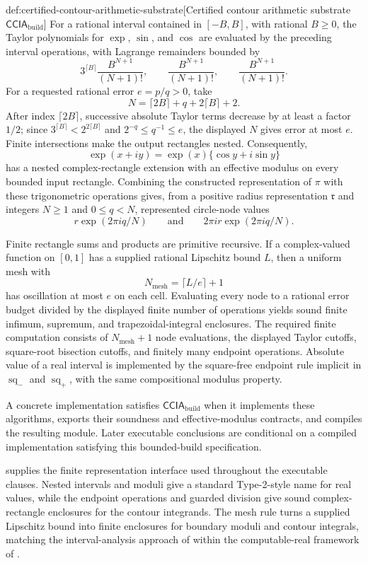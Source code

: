 \documentclass[11pt]{article}
\begin{document}
\begin{definitionv}{def:certified-contour-arithmetic-substrate}[Certified contour arithmetic substrate \(\mathsf{CCIA}_{\mathrm{build}}\)]
For a rational interval contained in \([-B,B]\), with rational \(B\ge0\), the Taylor polynomials for \(\exp\), \(\sin\), and \(\cos\) are evaluated by the preceding interval operations, with Lagrange remainders bounded by
\[
3^{\lceil B\rceil}\frac{B^{N+1}}{(N+1)!},
\qquad
\frac{B^{N+1}}{(N+1)!},
\qquad
\frac{B^{N+1}}{(N+1)!}.
\]
For a requested rational error \(e=p/q>0\), take
\[
N=\lceil2B\rceil+q+2\lceil B\rceil+2.
\]
After index \(\lceil2B\rceil\), successive absolute Taylor terms decrease by at least a factor \(1/2\); since \(3^{\lceil B\rceil}<2^{2\lceil B\rceil}\) and \(2^{-q}\le q^{-1}\le e\), the displayed \(N\) gives error at most \(e\). Finite intersections make the output rectangles nested. Consequently,
\[
\exp(x+iy)=\exp(x)\{\cos y+i\sin y\}
\]
has a nested complex-rectangle extension with an effective modulus on every bounded input rectangle. Combining the constructed representation of \(\pi\) with these trigonometric operations gives, from a positive radius representation \(\mathfrak r\) and integers \(N\ge1\) and \(0\le q<N\), represented circle-node values
\[
r\exp(2\pi iq/N)
\qquad\text{and}\qquad
2\pi i r\exp(2\pi iq/N).
\]

Finite rectangle sums and products are primitive recursive. If a complex-valued function on \([0,1]\) has a supplied rational Lipschitz bound \(L\), then a uniform mesh with
\[
N_{\mathrm{mesh}}=\lceil L/e\rceil+1
\]
has oscillation at most \(e\) on each cell. Evaluating every node to a rational error budget divided by the displayed finite number of operations yields sound finite infimum, supremum, and trapezoidal-integral enclosures. The required finite computation consists of \(N_{\mathrm{mesh}}+1\) node evaluations, the displayed Taylor cutoffs, square-root bisection cutoffs, and finitely many endpoint operations. Absolute value of a real interval is implemented by the square-free endpoint rule implicit in \(\operatorname{sq}_{-}\) and \(\operatorname{sq}_{+}\), with the same compositional modulus property.

A concrete implementation satisfies \(\mathsf{CCIA}_{\mathrm{build}}\) when it implements these algorithms, exports their soundness and effective-modulus contracts, and compiles the resulting module. Later executable conclusions are conditional on a compiled implementation satisfying this bounded-build specification.
\end{definitionv}

 supplies the finite representation interface used throughout the executable clauses. Nested intervals and moduli give a standard Type-2-style name for real values, while the endpoint operations and guarded division give sound complex-rectangle enclosures for the contour integrands. The mesh rule turns a supplied Lipschitz bound into finite enclosures for boundary moduli and contour integrals, matching the interval-analysis approach of \citet{Moore1966} within the computable-real framework of \citet{Weihrauch2000,Ko1991}.
\end{document}
